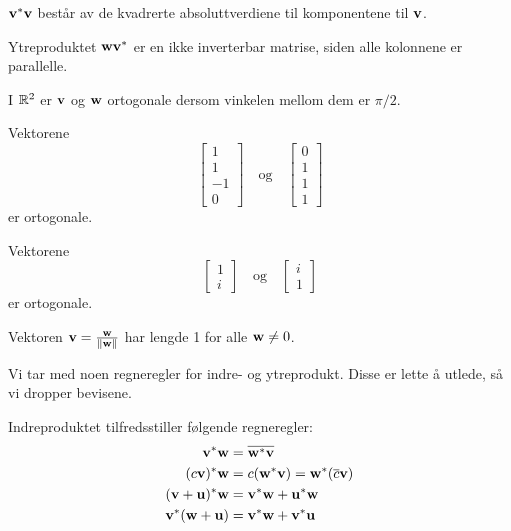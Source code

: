  
\begin{merkx}
$\mathbf{v}^*\mathbf{v}$ består av de kvadrerte absoluttverdiene til komponentene til $\mathbf{v}$. 
\end{merkx}
 
 \begin{merkx}
 Ytreproduktet $ \mathbf{w} \mathbf{v}^*$ er en ikke inverterbar matrise, siden alle kolonnene er parallelle.
 \end{merkx}
 
 

 \begin{ex}
I $\mathbb{R}^2$ er $\mathbf{v}$ og $\mathbf{w}$ ortogonale dersom vinkelen mellom dem er $\pi/2$.
\end{ex}


 \begin{ex}
 Vektorene 
 \[
 \begin{bmatrix}
 1 \\ 
 1 \\
 -1\\
 0
 \end{bmatrix}
 \quad
 \text{og}
 \quad
  \begin{bmatrix}
 0 \\ 
 1 \\
 1\\
 1
 \end{bmatrix}
\]
er ortogonale. 
 \end{ex}

 \begin{ex}
 Vektorene 
 \[
 \begin{bmatrix}
 1 \\ 
 i 
 \end{bmatrix}
 \quad
 \text{og}
 \quad
  \begin{bmatrix}
 i \\ 
1
 \end{bmatrix}
\]
er ortogonale. 
 \end{ex}


 \begin{ex}
 Vektoren $\mathbf{v}=\frac{\mathbf{w}}{\|\mathbf{w}\|}$ har lengde 1 for alle $\mathbf{w} \neq 0$.
 \end{ex}
 
 Vi tar med noen regneregler for indre- og ytreprodukt. Disse er lette å utlede, så vi dropper bevisene.
\begin{thm}
Indreproduktet tilfredsstiller følgende regneregler:
\begin{align*}
 \mathbf{v} ^* \mathbf{w}&=\overline{\mathbf{w} ^* \mathbf{v}} \\
( c\mathbf{v} )^* \mathbf{w}&=c(\mathbf{w} ^* \mathbf{v} ) = \mathbf{w} ^* (\overline c\mathbf{v}) \\
 (\mathbf{v}+\mathbf{u}) ^* \mathbf{w}&= \mathbf{v} ^* \mathbf{w}+ \mathbf{u} ^* \mathbf{w} \\
  \mathbf{v} ^* (\mathbf{w}+\mathbf{u})&= \mathbf{v} ^* \mathbf{w}+ \mathbf{v} ^* \mathbf{u}
\end{align*}
\end{thm}
 
